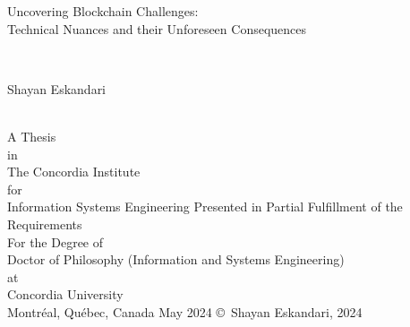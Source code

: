 
\thispagestyle{empty} %

\begin{center} 
\begin{Large} Uncovering Blockchain Challenges: \\ Technical Nuances and their Unforeseen Consequences\end{Large}\\[3em]
\begin{large} Shayan Eskandari \end{large}\\
\vfill
A Thesis\\
in \\
The Concordia Institute \\
for \\
Information Systems Engineering
\vfill
Presented in Partial Fulfillment of the Requirements\\
For the Degree of\\
Doctor of Philosophy (Information and Systems Engineering) \\
at \\
Concordia University\\
Montr\'{e}al, Qu\'{e}bec, Canada
\vfill
May 2024 
\vfill
\copyright~Shayan Eskandari, 2024\\
\end{center}

